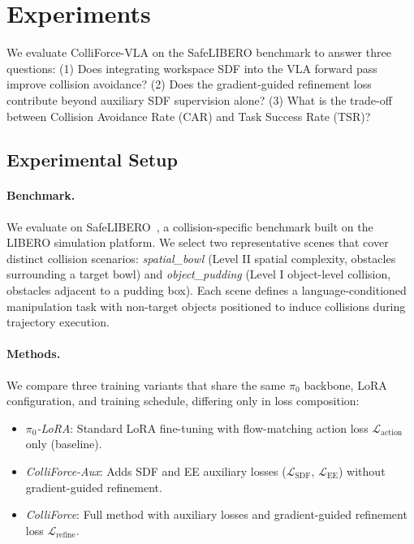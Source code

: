 \section{Experiments}\label{sec:experiments}

We evaluate ColliForce-VLA on the SafeLIBERO benchmark to answer three questions: (1) Does integrating workspace SDF into the VLA forward pass improve collision avoidance? (2) Does the gradient-guided refinement loss contribute beyond auxiliary SDF supervision alone? (3) What is the trade-off between Collision Avoidance Rate (CAR) and Task Success Rate (TSR)?

\subsection{Experimental Setup}\label{sec:setup}

\paragraph{Benchmark.} We evaluate on SafeLIBERO~\cite{hu2025vlsa}, a collision-specific benchmark built on the LIBERO simulation platform. We select two representative scenes that cover distinct collision scenarios: \textit{spatial\_bowl} (Level II spatial complexity, obstacles surrounding a target bowl) and \textit{object\_pudding} (Level I object-level collision, obstacles adjacent to a pudding box). Each scene defines a language-conditioned manipulation task with non-target objects positioned to induce collisions during trajectory execution.

\paragraph{Methods.} We compare three training variants that share the same $\pi_0$ backbone, LoRA configuration, and training schedule, differing only in loss composition:
\begin{itemize}
    \item \textit{$\pi_0$-LoRA}: Standard LoRA fine-tuning with flow-matching action loss $\mathcal{L}_\mathrm{action}$ only (baseline).
    \item \textit{ColliForce-Aux}: Adds SDF and EE auxiliary losses ($\mathcal{L}_\mathrm{SDF}$, $\mathcal{L}_\mathrm{EE}$) without gradient-guided refinement.
    \item \textit{ColliForce}: Full method with auxiliary losses and gradient-guided refinement loss $\mathcal{L}_\mathrm{refine}$.
\end{itemize}


